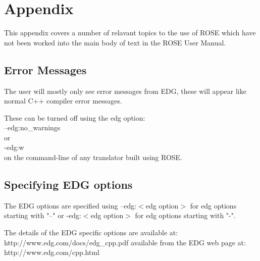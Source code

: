 
\chapter{ Appendix }

% 

   This appendix covers a number of relavant topics to the use of ROSE
which have not been worked into the main body of text in the ROSE User Manual.


\section {Error Messages}

   The user will mostly only see error messages from EDG, these will
appear like normal C++ compiler error messages.

   These can be turned off using the edg option: \\
   --edg:no\_warnings \\
or \\
   -edg:w \\
on the command-line of any translator built using ROSE.

\section {Specifying EDG options}

   The EDG options are specified using --edg:$<$edg option$>$ for edg options starting 
with "--" or -edg:$<$edg option$>$ for edg options starting with "-".

The details of the EDG specific options are available at: \\
    http://www.edg.com/docs/edg\_cpp.pdf
available from the EDG web page at:\\
    http://www.edg.com/cpp.html

